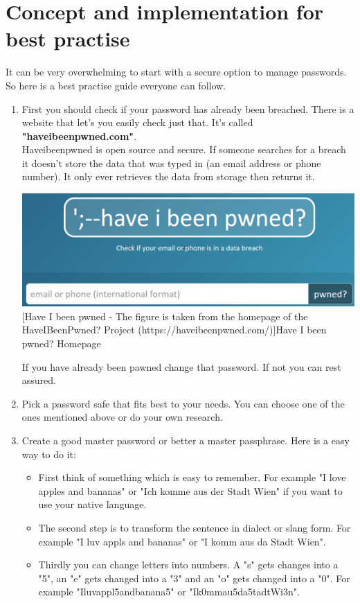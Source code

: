 \documentclass[conference]{IEEEtran}
\begin{document}
\section{Concept and implementation for best practise}
It can be very overwhelming to start with a secure option to manage passwords. So here is a best practise guide everyone can follow.
\begin{enumerate}
\item First you should check if your password has already been breached. There is a website that let's you easily check just that. It's called \textbf{"haveibeenpwned.com"}.\\
Haveibeenpwned is open source and secure. If someone searches for a breach it doesn't store the data that was typed in (an email address or phone number). It only ever retrieves the data from storage then returns it. \vspace{0.5cm}
\begin{center}
\includegraphics[scale=0.29]{./images/haveibeenpwned.png}
[Have I been pwned - The figure is taken from the homepage of the HaveIBeenPwned? Project (https://haveibeenpwned.com/)]{Have I been pwned? Homepage}
\end{center}
If you have already been pawned change that password. If not you can rest assured. 
\item Pick a password safe that fits best to your needs. You can choose one of the ones mentioned above or do your own research.
\item Create a good master password or better a master passphrase. Here is a easy way to do it: 
\begin{itemize}
\item First think of something which is easy to remember. For example "I love apples and bananas" or "Ich komme aus der Stadt Wien" if you want to use your native language.
\item The second step is to transform the sentence in dialect or slang form. For example "I luv appls and bananas" or "I komm aus da Stadt Wien".
\item Thirdly you can change letters into numbers. A "s" gets changes into a "5", an "e" gets changed into a "3" and an "o" gets changed into a "0". For example "Iluvappl5andbanana5" or "Ik0mmau5da5tadtWi3n".

\end{itemize}
\end{enumerate}
\end{document}
